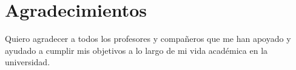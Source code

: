 \chapter*{Agradecimientos}

Quiero agradecer a todos los profesores y compañeros que me han apoyado y ayudado a cumplir mis objetivos a lo largo de mi vida académica en la universidad.